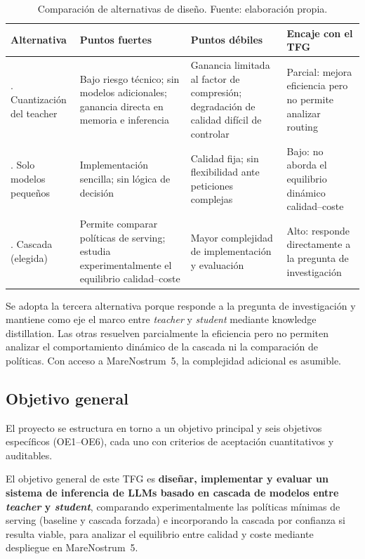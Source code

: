 \documentclass[11pt,a4paper]{article}
\begin{document}
\begin{table}[H]
\centering
\caption{Comparación de alternativas de diseño. Fuente: elaboración propia.}
\label{tab:alternativas}
\footnotesize
\begin{tabularx}{\textwidth}{>{\raggedright\arraybackslash}p{2.8cm} >{\raggedright\arraybackslash}X >{\raggedright\arraybackslash}X >{\raggedright\arraybackslash}p{3cm}}
\toprule
\textbf{Alternativa} & \textbf{Puntos fuertes} & \textbf{Puntos débiles} & \textbf{Encaje con el TFG} \\
\midrule
1. Cuantización del teacher & Bajo riesgo técnico; sin modelos adicionales; ganancia directa en memoria e inferencia & Ganancia limitada al factor de compresión; degradación de calidad difícil de controlar & Parcial: mejora eficiencia pero no permite analizar routing \\
\addlinespace
2. Solo modelos pequeños & Implementación sencilla; sin lógica de decisión & Calidad fija; sin flexibilidad ante peticiones complejas & Bajo: no aborda el equilibrio dinámico calidad--coste \\
\addlinespace
3. Cascada (elegida) & Permite comparar políticas de serving; estudia experimentalmente el equilibrio calidad--coste & Mayor complejidad de implementación y evaluación & Alto: responde directamente a la pregunta de investigación \\
\bottomrule
\end{tabularx}
\end{table}

Se adopta la tercera alternativa porque responde a la pregunta de investigación y mantiene como eje el marco entre \textit{teacher} y \textit{student} mediante knowledge distillation. Las otras resuelven parcialmente la eficiencia pero no permiten analizar el comportamiento dinámico de la cascada ni la comparación de políticas. Con acceso a MareNostrum~5, la complejidad adicional es asumible.

\subsection{Objetivo general}

El proyecto se estructura en torno a un objetivo principal y seis objetivos específicos (OE1--OE6), cada uno con criterios de aceptación cuantitativos y auditables.

El objetivo general de este TFG es \textbf{diseñar, implementar y evaluar un sistema de inferencia de LLMs basado en cascada de modelos entre \textit{teacher} y \textit{student}}, comparando experimentalmente las políticas mínimas de serving (baseline y cascada forzada) e incorporando la cascada por confianza si resulta viable, para analizar el equilibrio entre calidad y coste mediante despliegue en MareNostrum~5.
\end{document}
